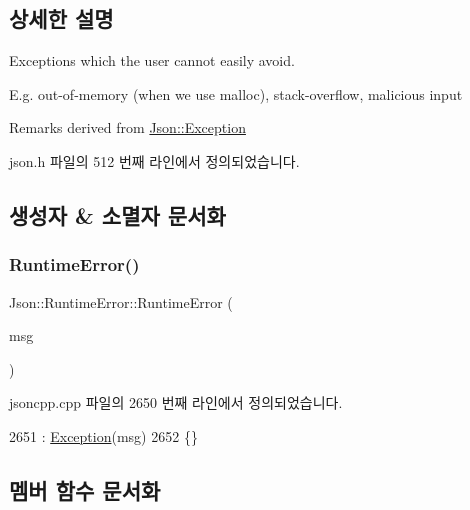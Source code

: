 \subsection{상세한 설명}
Exceptions which the user cannot easily avoid.

E.\+g. out-\/of-\/memory (when we use malloc), stack-\/overflow, malicious input

\begin{DoxyRemark}{Remarks}
derived from \hyperlink{class_json_1_1_exception}{Json\+::\+Exception} 
\end{DoxyRemark}


json.\+h 파일의 512 번째 라인에서 정의되었습니다.



\subsection{생성자 \& 소멸자 문서화}
\mbox{\label{class_json_1_1_runtime_error_a0f6445dc345ce0a703610b6e893fee40}} 
\subsubsection{\texorpdfstring{Runtime\+Error()}{RuntimeError()}}
{\footnotesize\ttfamily Json\+::\+Runtime\+Error\+::\+Runtime\+Error (\begin{DoxyParamCaption}\item[{\hyperlink{json_8h_a1e723f95759de062585bc4a8fd3fa4be}{J\+S\+O\+N\+C\+P\+P\+\_\+\+S\+T\+R\+I\+NG} const \&}]{msg }\end{DoxyParamCaption})}



jsoncpp.\+cpp 파일의 2650 번째 라인에서 정의되었습니다.


\begin{DoxyCode}
2651   : \hyperlink{class_json_1_1_exception_ae764aa42e0755bd4ce9d303e2733fa8f}{Exception}(msg)
2652 \{\}
\end{DoxyCode}


\subsection{멤버 함수 문서화}
\mbox{\label{class_json_1_1_exception_a70b7ce35e761fb93e8cd338e04619cd6}} 
